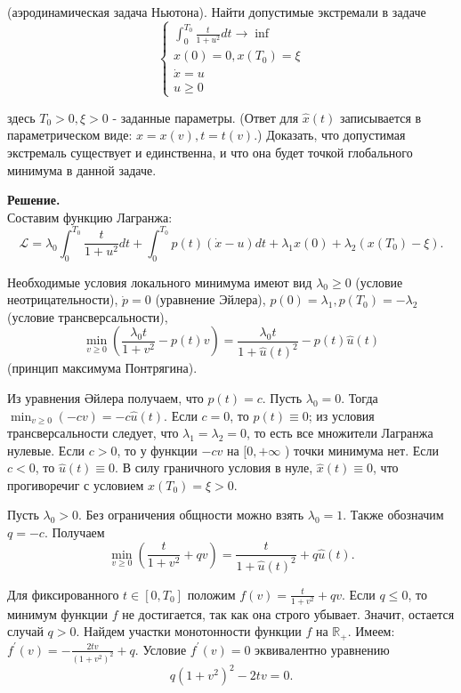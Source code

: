 \begin{task}
    (аэродинамическая задача Ньютона). Найти допустимые экстремали в задаче
    $$
        \begin{cases}
            \int_0^{T_0} \frac{t}{1+u^2} d t \rightarrow \inf
            \\
            x(0)=0, x\left(T_0\right)=\xi
            \\
            \dot{x}=u
            \\
            u \geq 0
        \end{cases}
    $$

    здесь $T_0>0, \xi>0$ - заданные параметры. (Ответ для $\hat{x}(t)$ записывается в параметрическом виде: $x=x(v), t=t(v)$.)
    Доказать, что допустимая экстремаль существует и единственна, и что она будет точкой глобального минимума в данной задаче.

    \textbf{Решение.} \\
    Составим функцию Лагранжа:
    $$
        \mathcal{L}=\lambda_0 \int_0^{T_0} \frac{t}{1+u^2} d t+\int_0^{T_0} p(t)(\dot{x}-u) d t+\lambda_1 x(0)+\lambda_2\left(x\left(T_0\right)-\xi\right) .
    $$

    Необходимые условия локального минимума имеют вид $\lambda_0 \geq 0$ (условие неотрицательности), 
    $\dot{p}=0$ (уравнение Эйлера), $p(0)=\lambda_1, p\left(T_0\right)=-\lambda_2$ (условие трансверсальности),
    $$
        \min _{v \geq 0}\left(\frac{\lambda_0 t}{1+v^2}-p(t) v\right)=\frac{\lambda_0 t}{1+\hat{u}(t)^2}-p(t) \hat{u}(t)
    $$
    (принцип максимума Понтрягина).

    Из уравнения Әйлера получаем, что $p(t)=c$.
    Пусть $\lambda_0=0$. Тогда $\min _{v \geq 0}(-c v)=-c \hat{u}(t)$. Если $c=0$, то $p(t) \equiv 0$; 
    из условия трансверсальности следует, что $\lambda_1=\lambda_2=0$, то есть все множители Лагранжа нулевые. 
    Если $c>0$, то у функции $-c v$ на $[0,+\infty$ ) точки минимума нет. Если $c<0$, то $\hat{u}(t) \equiv 0$. 
    В силу граничного условия в нуле, $\hat{x}(t) \equiv 0$, что прогиворечиг с условием $x\left(T_0\right)=\xi>0$.

    Пусть $\lambda_0>0$. Без ограничения общности можно взять $\lambda_0=1$. Также обозначим $q=-c$. Получаем
    $$
        \min _{v \geq 0}\left(\frac{t}{1+v^2}+q v\right)=\frac{t}{1+\hat{u}(t)^2}+q \hat{u}(t) .
    $$

    Для фиксированного $t \in\left[0, T_0\right]$ положим $f(v)=\frac{t}{1+v^2}+q v$. 
    Если $q \leq 0$, то минимум функции $f$ не достигается, так как она строго убывает. Значит, остается случай $q>0$.
    Найдем участки монотонности функции $f$ на $\mathbb{R}_{+}$.
    Имеем: $f^{\prime}(v)=-\frac{2 t v}{\left(1+v^2\right)^2}+q$. Условие $f^{\prime}(v)=0$ эквивалентно уравнению
    \begin{equation} \label{eq201}
        q\left(1+v^2\right)^2-2 t v=0.
    \end{equation}


\end{task}
